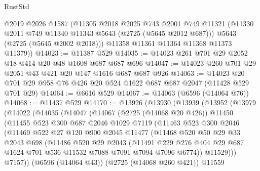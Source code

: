 \begin{lexlean}{RustStd}
\begin{coremodule}
        @2019
        @2026
        @1587
        (@11305
          @2018
          @2025
          @743
          @2001
          @749
          @11321
          (@11330 @2011 @749 @11340 @11343 @5643 (@2725 (@5645 @2012 @687)))
          @5643
          (@2725 (@5645 @2002 @2018)))
        @11358
        @11361
        @11364
        @11368
        @11373
        @11379))
@14023 := @11387 @529
@14035 := @14023 @261 @701 @29 @2052 @18 @414 @20 @48 @1608 @687 @687 @696
@14047 := @14023 @260 @701 @29 @2051 @43 @421 @20 @147 @1616 @687 @687 @926
@14063 := @14023 @20 @701 @29 @958 @76 @426 @20 @524 @1622 @687 @687 @2047 (@11428 @529 @701 @29)
@14064 := @6616 @529
@14067 := @14063 (@6596 (@14064 @76))
@14068 := @11437 @529
@14170 := @13926
    (@13930
      (@13939
        (@13952
          (@13979
            (@14022
              (@14035
                (@14047
                  (@14067
                    (@2725 (@14068 @20 @426))
                    @11450
                    (@11455
                      @523
                      @300
                      @687
                      @2046
                      @1029
                      @7119
                      (@11463
                        @523
                        @300
                        @2046
                        (@11469
                          @522
                          @27
                          @120
                          @900
                          @2045
                          @11477
                          (@11468
                            @520
                            @50
                            @29
                            @33
                            @2043
                            @698
                            (@11486
                              @520
                              @29
                              @2043
                              (@11491
                                @229
                                @276
                                @404
                                @29
                                @687
                                @1624
                                @701
                                @536
                                @11532
                                @7088
                                @7091
                                @7094
                                @7096
                                @6774))
                            @11529)))
                      @7157))
                  (@6596 (@14064 @43))
                  (@2725 (@14068 @260 @421))
                  @11559

\end{coremodule}
\end{lexlean}
